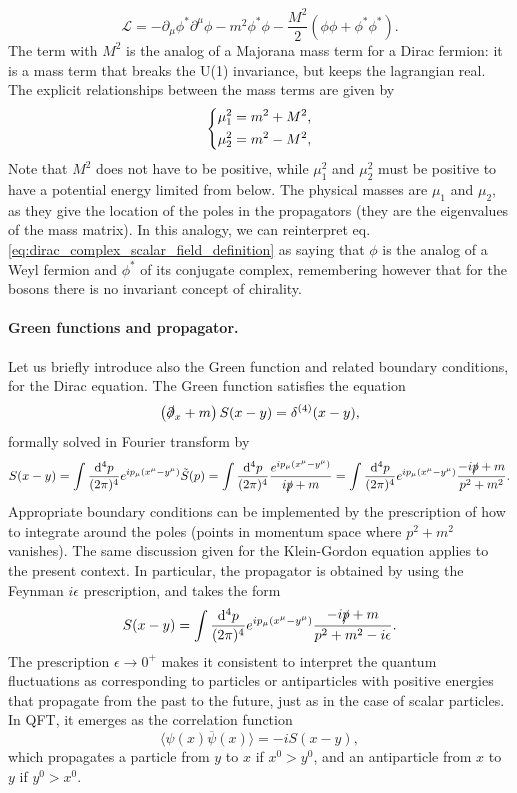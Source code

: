 \begin{equation}
    \mathcal{L} = -\partial_\mu \phi^* \partial^\mu \phi - m^2 \phi^* \phi - \frac{M^2}{2} (\phi \phi + \phi^{*} \phi^{*}).
    \label{eq:dirac_complex_scalar_field_majorana_mass}
\end{equation}
The term with \(M^2\) is the analog of a Majorana mass term for a Dirac fermion: it is a mass term that breaks the U(1) invariance, but keeps the lagrangian real. The explicit relationships between the mass terms are given by
\[
    \begin{dcases}
        \mu_1^2 = m^2 + M^2, \\
        \mu_2^2 = m^2 - M^2,
    \end{dcases}
\]
Note that \(M^{2}\) does not have to be positive, while \(\mu_1^2\) and \(\mu_2^2\) must be positive to have a potential energy limited from below. The physical masses are \(\mu_1\) and \(\mu_2\), as they give the location of the poles in the propagators (they are the eigenvalues of the mass matrix). In this analogy, we can reinterpret eq. \eqref{eq:dirac_complex_scalar_field_definition} as saying that \(\phi\) is the analog of a Weyl fermion and \(\phi^*\) of its conjugate complex, remembering however that for the bosons there is no invariant concept of chirality.

\paragraph{Green functions and propagator.}

Let us briefly introduce also the Green function and related boundary conditions, for the Dirac equation. The Green function satisfies the equation
\[
    \left(\slashed{\partial}_x + m\right) S(x-y) = \delta^{(4)}(x-y),
\]
formally solved in Fourier transform by
\[
    S(x-y) = \int \frac{\mathrm{d}^4 p}{(2\pi)^4} e^{i p_\mu (x^{\mu}-y^{\mu})} \tilde{S}(p) = \int \frac{\mathrm{d}^4 p}{(2\pi)^4} \frac{e^{i p_\mu (x^{\mu}-y^{\mu})}}{i \slashed{p} + m} = \int \frac{\mathrm{d}^4 p}{(2\pi)^4} e^{i p_\mu (x^{\mu}-y^{\mu})} \frac{-i \slashed{p} + m}{p^2 + m^2}.
\]
Appropriate boundary conditions can be implemented by the prescription of how to integrate around the poles (points in momentum space where \(p^2 + m^2\) vanishes). The same discussion given for the Klein-Gordon equation applies to the present context. In particular, the propagator is obtained by using the Feynman \(i\epsilon\) prescription, and takes the form
\[
    S(x-y) = \int \frac{\mathrm{d}^4 p}{(2\pi)^4} e^{i p_\mu (x^{\mu}-y^{\mu})} \frac{-i \slashed{p} + m}{p^2 + m^2 - i \epsilon}.
\]
The prescription \( \epsilon \to 0^+ \) makes it consistent to interpret the quantum fluctuations as corresponding to particles or antiparticles with positive energies that propagate from the past to the future, just as in the case of scalar particles. In QFT, it emerges as the correlation function
\[
    \langle \psi(x)\overline{\psi}(x)\rangle = -i S(x-y),
\]
which propagates a particle from \(y\) to \(x\) if \(x^0 > y^0\), and an antiparticle from \(x\) to \(y\) if \(y^0 > x^0\).